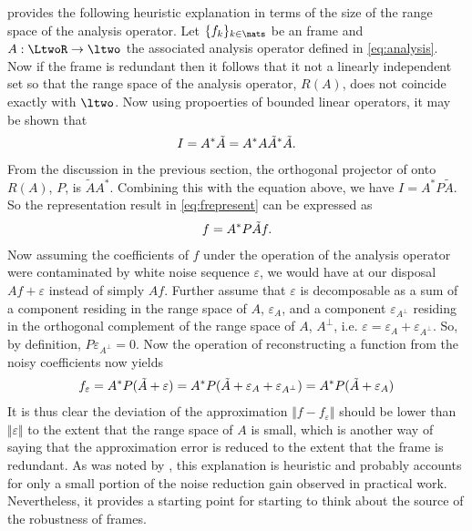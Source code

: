 \cite{Daubechies1992} provides the following heuristic explanation in terms of the size of the range space of the analysis operator. Let $\{f_k\}_{k \in \nats}$ be an \LtwoR frame and $A : \LtwoR \to \ltwo$ the associated analysis operator defined in \eqref{eq:analysis}. Now if the frame is redundant then it follows that it not a linearly independent set so that the range space of the analysis operator, $R(A)$, does not coincide exactly with $\ltwo$. Now using propoerties of bounded linear operators, it may be shown that 
\begin{align}
  I = A^*\tilde{A}= A^*A\tilde{A}^*\tilde{A}. \notag
  \label{}
\end{align}
From the discussion in the previous section,   the orthogonal projector of \ltwo onto $R(A)$, $P$,  is  $\tilde{A}A^*$. Combining this with the equation above, we have $I =  A^* P \tilde{A}$. So the representation result in \eqref{eq:frepresent} can be expressed as 
\begin{align}
  f = A^* P \tilde{A}f.\notag
  \label{}
\end{align}
Now assuming the coefficients of $f$ under the operation of the analysis operator were contaminated by white noise sequence $\varepsilon$, we would have at our disposal $Af + \varepsilon$ instead of simply $Af$. Further assume that $\varepsilon$ is decomposable as a sum of a component residing in the range space of $A$, $\varepsilon_A$, and a component $\varepsilon_{A^\perp}$ residing in the orthogonal complement  of the range space of  $A$, $A^\perp$, i.e. $\varepsilon = \varepsilon_A + \varepsilon_{A^\perp}$. So, by definition, $P \varepsilon_{A^\perp} = 0$.  Now the operation of reconstructing a function from the noisy coefficients now yields
\begin{align}
  f_\varepsilon = A^*P(\tilde{A} + \varepsilon) = A^*P(\tilde{A} + \varepsilon_A + \varepsilon_{A^\perp}) = A^*P(\tilde{A} + \varepsilon_A ) \notag
  \label{}
\end{align}
It is thus clear the deviation of the approximation $\Vert f - f_\varepsilon \Vert$  should be lower than $\Vert \varepsilon \Vert$ to the extent that the range space of $A$ is small, which is another way of saying that the approximation error is reduced to the extent that the frame is redundant. As was noted by \cite{Daubechies1992}, this explanation is heuristic and probably accounts for only a small portion of the noise reduction gain observed in practical work. Nevertheless,  it provides a starting point for starting to think about the source of the robustness of frames. 
